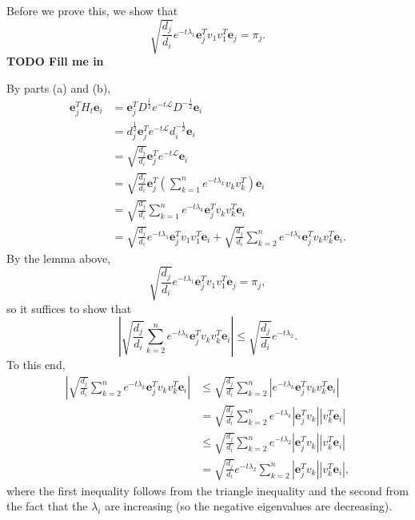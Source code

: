 \documentclass{article}
\newcommand{\todo}[1]{\textbf{TODO #1}}
\newcommand{\1}{\mathbf{1}}
\newcommand{\0}{\mathbf{0}}
\newcommand{\e}{\mathbf{e}}
\renewcommand{\L}{\mathcal{L}}
\begin{document}
\begin{enumerate}
\begin{enumerate}
    Before we prove this, we show that
    \begin{equation*}
      \sqrt{\frac{d_j}{d_i}} e^{-t \lambda_1} \e_j^T v_1 v_1^T \e_j = \pi_j.
    \end{equation*}
    \todo{Fill me in}

    By parts (a) and (b),
    \begin{align*}
      \e_j^T H_t \e_i &= \e_j^T D^{\frac{1}{2}} e^{-t \L} D^{-\frac{1}{2}} \e_i \\
      & = d_j^{\frac{1}{2}} \e_j^T e^{-t \L} d_i^{-\frac{1}{2}} \e_i \\
      & = \sqrt{\frac{d_j}{d_i}} \e_j^T e^{-t \L} \e_i \\
      & = \sqrt{\frac{d_j}{d_i}} \e_j^T (\sum_{k = 1}^n e^{-t \lambda_k} v_k v_k^T) \e_i \\
      & = \sqrt{\frac{d_j}{d_i}} \sum_{k = 1}^n e^{-t \lambda_k} \e_j^T v_k v_k^T \e_i \\
       & = \sqrt{\frac{d_j}{d_i}} e^{-t \lambda_1} \e_j^T v_1 v_1^T \e_i + \sqrt{\frac{d_j}{d_i}} \sum_{k = 2}^n e^{-t \lambda_k} \e_j^T v_k v_k^T \e_i.
    \end{align*}
    By the lemma above,
    \begin{equation*}
      \sqrt{\frac{d_j}{d_i}} e^{-t \lambda_1} \e_j^T v_1 v_1^T \e_j = \pi_j,
    \end{equation*}
    so it suffices to show that
    \begin{equation*}
      \left|\sqrt{\frac{d_j}{d_i}} \sum_{k = 2}^n e^{-t \lambda_k} \e_j^T v_k v_k^T \e_i\right| \leq \sqrt{\frac{d_j}{d_i}} e^{-t \lambda_2}.
    \end{equation*}
    To this end,
    \begin{align*}
      \left|\sqrt{\frac{d_j}{d_i}} \sum_{k = 2}^n e^{-t \lambda_k} \e_j^T v_k v_k^T \e_i\right| & \leq \sqrt{\frac{d_j}{d_i}} \sum_{k = 2}^n \left|e^{-t \lambda_k} \e_j^T v_k v_k^T \e_i\right| \\
      & = \sqrt{\frac{d_j}{d_i}} \sum_{k = 2}^n e^{-t \lambda_k} \left|\e_j^T v_k\right| \left|v_k^T \e_i\right| \\
      & \leq \sqrt{\frac{d_j}{d_i}} \sum_{k = 2}^n e^{-t \lambda_2} \left|\e_j^T v_k\right| \left|v_k^T \e_i\right| \\
      & = \sqrt{\frac{d_j}{d_i}} e^{-t \lambda_2} \sum_{k = 2}^n \left|\e_j^T v_k\right| \left|v_k^T \e_i\right|,
    \end{align*}
    where the first inequality follows from the triangle inequality and the second from the fact that the $\lambda_i$ are increasing (so the negative eigenvalues are decreasing).

\end{enumerate}
\end{enumerate}
\end{document}
